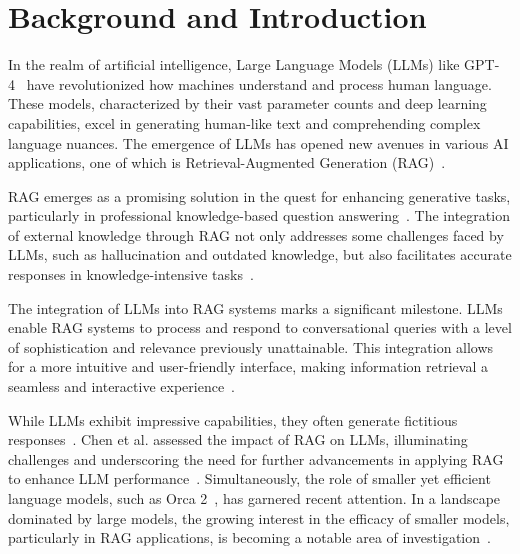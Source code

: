 \documentclass[runningheads]{llncs}
\begin{document}
\section{Background and Introduction}
\label{sec:Intro}
In the realm of artificial intelligence, Large Language Models (LLMs) like GPT-4~\cite{achiam2023gpt} have revolutionized how machines understand and process human language. These models, characterized by their vast parameter counts and deep learning capabilities, excel in generating human-like text and comprehending complex language nuances. The emergence of LLMs has opened new avenues in various AI applications, one of which is Retrieval-Augmented Generation (RAG)~\cite{chen2023benchmarking,es2023ragas,lewis2020retrieval,liu2023reta}.

RAG emerges as a promising solution in the quest for enhancing generative tasks, particularly in professional knowledge-based question answering~\cite{es2023ragas,lewis2020retrieval,saad2023ares}. The integration of external knowledge through RAG not only addresses some challenges faced by LLMs, such as hallucination and outdated knowledge, but also facilitates accurate responses in knowledge-intensive tasks~\cite{lewis2020retrieval}. 

The integration of LLMs into RAG systems marks a significant milestone. LLMs enable RAG systems to process and respond to conversational queries with a level of sophistication and relevance previously unattainable. This integration allows for a more intuitive and user-friendly interface, making information retrieval a seamless and interactive experience~\cite{lewis2020retrieval,lin2024revolutionizing}.

While LLMs exhibit impressive capabilities, they often generate fictitious responses~\cite{liu2023reta}. Chen et al. assessed the impact of RAG on LLMs, illuminating challenges and underscoring the need for further advancements in applying RAG to enhance LLM performance~\cite{chen2023benchmarking}. Simultaneously, the role of smaller yet efficient language models, such as Orca 2~\cite{mitra2023orca}, has garnered recent attention. In a landscape dominated by large models, the growing interest in the efficacy of smaller models, particularly in RAG applications, is becoming a notable area of investigation~\cite{mitra2023orca,mukherjee2023orca}.
\end{document}
